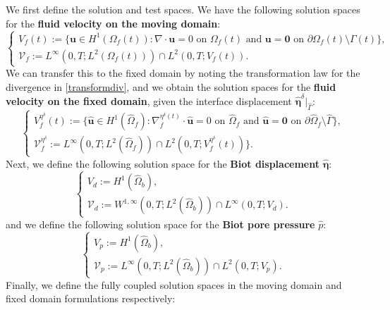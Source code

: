\documentclass[11pt]{article}
\newcommand{\bd}{\boldsymbol}
\theoremstyle{definition}
\begin{document}
We first define the solution and test spaces. We have the following solution spaces for the \textbf{fluid velocity on the moving domain}:
\begin{equation*}
\begin{cases}
V_{f}(t) := \{\bd{u} \in H^{1}(\Omega_{f}(t)) : \nabla \cdot \bd{u} = 0 \text{ on } \Omega_{f}(t) \text{ and } \bd{u} = \bd{0} \text{ on } \partial \Omega_{f}(t) \setminus \Gamma(t)\}, \\
\mathcal{V}_{f} := L^{\infty}(0, T; L^{2}(\Omega_{f}(t))) \cap L^{2}(0, T; V_{f}(t)).
\end{cases}
\end{equation*}
We can transfer this to the fixed domain by noting the transformation law for the divergence in \eqref{transformdiv}, and we obtain the solution spaces for the \textbf{fluid velocity on the fixed domain}, given the interface displacement $\hat{\bd{\eta}}^{\delta}|_{\hat{\Gamma}}$:
\begin{equation}\label{Vetaf}
\begin{cases}
V^{\eta^{\delta}}_{f}(t) := \{\hat{\bd{u}} \in H^{1}(\hat{\Omega}_{f}) : \nabla^{\eta^{\delta}(t)}_{f} \cdot \hat{\bd{u}} = 0 \text{ on } \hat{\Omega}_{f} \text{ and } \hat{\bd{u}} = \bd{0} \text{ on } \partial \hat{\Omega}_{f} \setminus \hat{\Gamma}\}, \\
\mathcal{V}^{\eta^{\delta}}_{f} := L^{\infty}(0, T; L^{2}(\hat{\Omega}_{f})) \cap L^{2}(0, T; V^{\eta^{\delta}}_{f}(t))\}.
\end{cases}
\end{equation}
Next, we define the following solution space for the \textbf{Biot displacement} $\hat{\bd{\eta}}$:
\begin{equation}\label{Vd}
\begin{cases}
V_{d} := H^{1}(\hat{\Omega}_{b}), \\
\mathcal{V}_{d} := W^{1, \infty}(0, T; L^{2}(\hat{\Omega}_{b})) \cap L^{\infty}(0, T; V_{d}).
\end{cases}
\end{equation}
and we define the following solution space for the \textbf{Biot pore pressure} $\hat{p}$:
\begin{equation}\label{Vp}
\begin{cases}
V_{p} := H^{1}(\hat{\Omega}_{b}), \\
\mathcal{V}_{p} := L^{\infty}(0, T; L^{2}(\hat{\Omega}_{b})) \cap L^{2}(0, T; V_{p}).
\end{cases}
\end{equation}
Finally, we define the fully coupled solution spaces in the moving domain and fixed domain formulations respectively:
\end{document}
